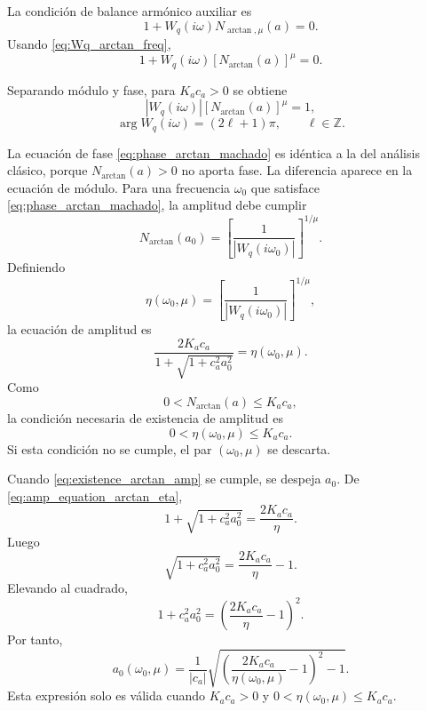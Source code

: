 \documentclass[journal]{IEEEtran}
\begin{document}
La condición de balance armónico auxiliar es
\begin{equation}
\label{eq:balance_arctan_machado}
1+
W_q(i\omega)N_{\arctan,\mu}(a)=0.
\end{equation}
Usando \eqref{eq:Wq_arctan_freq},
\begin{equation}
\label{eq:balance_arctan_machado_explicit}
1+
W_q(i\omega)
\left[
N_{\arctan}(a)
\right]^\mu
=
0.
\end{equation}

Separando módulo y fase, para \(K_a c_a>0\) se obtiene
\begin{equation}
\label{eq:mod_arctan_machado}
\left|
W_q(i\omega)
\right|
\left[
N_{\arctan}(a)
\right]^\mu
=
1,
\end{equation}
\begin{equation}
\label{eq:phase_arctan_machado}
\arg
W_q(i\omega)
=
(2\ell+1)\pi,
\qquad
\ell\in\mathbb Z.
\end{equation}

La ecuación de fase \eqref{eq:phase_arctan_machado} es idéntica a la del
análisis clásico, porque \(N_{\arctan}(a)>0\) no aporta fase. La diferencia
aparece en la ecuación de módulo. Para una frecuencia \(\omega_0\) que
satisface \eqref{eq:phase_arctan_machado}, la amplitud debe cumplir
\begin{equation}
\label{eq:N_target_arctan_machado}
N_{\arctan}(a_0)
=
\left[
\frac{1}{
\left|
W_q(i\omega_0)
\right|}
\right]^{1/\mu}.
\end{equation}
Definiendo
\[
\eta(\omega_0,\mu)
=
\left[
\frac{1}{
\left|
W_q(i\omega_0)
\right|}
\right]^{1/\mu},
\]
la ecuación de amplitud es
\begin{equation}
\label{eq:amp_equation_arctan_eta}
\frac{2K_a c_a}{
1+\sqrt{1+c_a^2a_0^2}
}
=
\eta(\omega_0,\mu).
\end{equation}
Como
\[
0<N_{\arctan}(a)\le K_a c_a,
\]
la condición necesaria de existencia de amplitud es
\begin{equation}
\label{eq:existence_arctan_amp}
0<\eta(\omega_0,\mu)\le K_a c_a.
\end{equation}
Si esta condición no se cumple, el par \((\omega_0,\mu)\) se descarta.

Cuando \eqref{eq:existence_arctan_amp} se cumple, se despeja \(a_0\). De
\eqref{eq:amp_equation_arctan_eta},
\[
1+\sqrt{1+c_a^2a_0^2}
=
\frac{2K_a c_a}{\eta}.
\]
Luego
\[
\sqrt{1+c_a^2a_0^2}
=
\frac{2K_a c_a}{\eta}-1.
\]
Elevando al cuadrado,
\[
1+c_a^2a_0^2
=
\left(
\frac{2K_a c_a}{\eta}-1
\right)^2.
\]
Por tanto,
\begin{equation}
\label{eq:a0_arctan_machado}
a_0(\omega_0,\mu)
=
\frac{1}{|c_a|}
\sqrt{
\left(
\frac{2K_a c_a}{\eta(\omega_0,\mu)}-1
\right)^2
-1
}.
\end{equation}
Esta expresión solo es válida cuando \(K_a c_a>0\) y
\(0<\eta(\omega_0,\mu)\le K_a c_a\).
\end{document}
